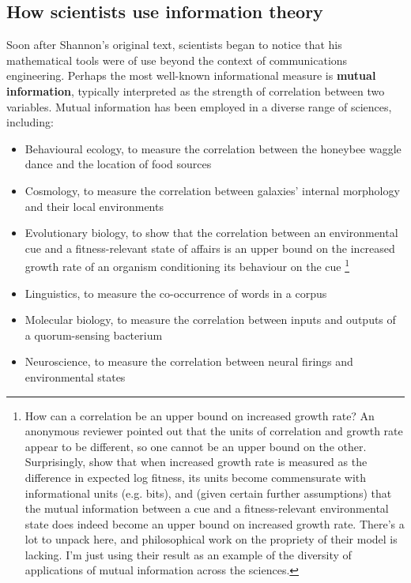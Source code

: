 \documentclass[12pt]{article}
\begin{document}
\subsection{How scientists use information theory}\label{subsec:scientists}

Soon after Shannon's original text, scientists began to notice that his mathematical tools were of use beyond the context of communications engineering.
Perhaps the most well-known informational measure is \textbf{mutual information}, typically interpreted as the strength of correlation between two variables.
Mutual information has been employed in a diverse range of sciences, including:

\begin{itemize}
    \item Behavioural ecology, to measure the correlation between the honeybee waggle dance and the location of food sources \citep{haldane1954statistical}
    \item Cosmology, to measure the correlation between galaxies' internal morphology and their local environments \citep{pandey2017how}
    \item Evolutionary biology, to show that the correlation between an environmental cue and a fitness-relevant state of affairs is an upper bound on the increased growth rate of an organism conditioning its behaviour on the cue \citep{donaldson-matasci2010fitness}\footnote{How can a correlation be an upper bound on increased growth rate? An anonymous reviewer pointed out that the units of correlation and growth rate appear to be different, so one cannot be an upper bound on the other. Surprisingly, \citet[224-226]{donaldson-matasci2010fitness} show that when increased growth rate is measured as the difference in expected log fitness, its units become commensurate with informational units (e.g. bits), and (given certain further assumptions) that the mutual information between a cue and a fitness-relevant environmental state does indeed become an upper bound on increased growth rate. There's a lot to unpack here, and philosophical work on the propriety of their model is lacking. I'm just using their result as an example of the diversity of applications of mutual information across the sciences.}
    \item Linguistics, to measure the co-occurrence of words in a corpus \citep[$\S$4]{hunston2002corpora}
    \item Molecular biology, to measure the correlation between inputs and outputs of a quorum-sensing bacterium \citep{mehta2009information}
    \item Neuroscience, to measure the correlation between neural firings and environmental states \citep[][and references therein]{rathkopf2017neural}
\end{itemize}
\end{document}
